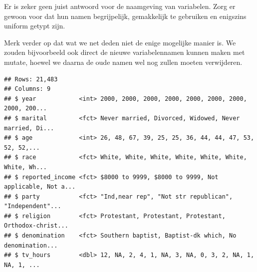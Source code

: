 \documentclass[]{tufte-book}
\newenvironment{Shaded}{}{}
\newcommand{\DataTypeTok}[1]{\textcolor[rgb]{0.56,0.13,0.00}{#1}}
\newcommand{\KeywordTok}[1]{\textcolor[rgb]{0.00,0.44,0.13}{\textbf{#1}}}
\newcommand{\NormalTok}[1]{#1}
\newcommand{\OperatorTok}[1]{\textcolor[rgb]{0.40,0.40,0.40}{#1}}
\newcommand{\StringTok}[1]{\textcolor[rgb]{0.25,0.44,0.63}{#1}}
\begin{document}
Er is zeker geen juist antwoord voor de naamgeving van variabelen. Zorg er gewoon voor dat hun namen begrijpelijk, gemakkelijk te gebruiken en enigszins uniform getypt zijn.

Merk verder op dat wat we net deden niet de enige mogelijke manier is. We zouden bijvoorbeeld ook direct de nieuwe variabelennamen kunnen maken met mutate, hoewel we daarna de oude namen wel nog zullen moeten verwijderen.

\begin{Shaded}
\end{Shaded}

\begin{verbatim}
## Rows: 21,483
## Columns: 9
## $ year            <int> 2000, 2000, 2000, 2000, 2000, 2000, 2000, 2000, 200...
## $ marital         <fct> Never married, Divorced, Widowed, Never married, Di...
## $ age             <int> 26, 48, 67, 39, 25, 25, 36, 44, 44, 47, 53, 52, 52,...
## $ race            <fct> White, White, White, White, White, White, White, Wh...
## $ reported_income <fct> $8000 to 9999, $8000 to 9999, Not applicable, Not a...
## $ party           <fct> "Ind,near rep", "Not str republican", "Independent"...
## $ religion        <fct> Protestant, Protestant, Protestant, Orthodox-christ...
## $ denomination    <fct> Southern baptist, Baptist-dk which, No denomination...
## $ tv_hours        <dbl> 12, NA, 2, 4, 1, NA, 3, NA, 0, 3, 2, NA, 1, NA, 1, ...
\end{verbatim}
\end{document}
